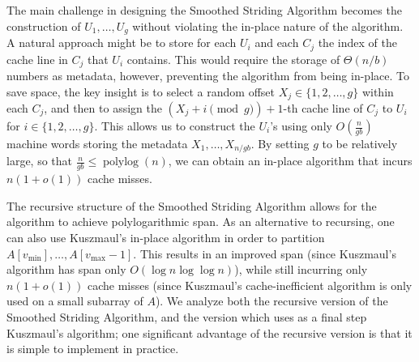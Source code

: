\documentclass[11pt]{article}
\newcommand{\defn}[1]{{\textit{\textbf{\boldmath #1}}} }
\theoremstyle{remark}
\theoremstyle{remark}
\begin{document}
The main challenge in designing the Smoothed Striding Algorithm
becomes the construction of $U_1, \ldots, U_{g}$ without
violating the in-place nature of the algorithm. A natural approach
might be to store for each $U_i$ and each $C_j$ the index of the cache
line in $C_j$ that $U_i$ contains. This would require the storage of
$\Theta(n / b)$ numbers as metadata, however, preventing the algorithm
from being in-place. To save space, the key insight is to select a
random offset $X_j \in \{1, 2, \ldots, g\}$ within each $C_j$, and
then to assign the $(X_j + i \pmod g) + 1$-th cache line of $C_j$ to
$U_i$ for $i \in \{1, 2, \ldots, g\}$. This allows us to construct
the $U_i$'s using only $O\left(\frac{n}{gb}\right)$ machine words
storing the metadata $X_1, \ldots, X_{n / gb}$. By setting $g$ to
be relatively large, so that $\frac{n}{gb} \le
\operatorname{polylog}(n)$, we can obtain an in-place algorithm that
incurs $n (1 + o(1))$ cache misses.

The recursive structure of the Smoothed Striding Algorithm allows for the
algorithm to achieve polylogarithmic span. As an alternative to recursing, one
can also use Kuszmaul's in-place algorithm \cite{Kuszmaul19} in order to
partition $A[v_{\text{min}}], \ldots, A[v_{\text{max}} - 1]$. This results
in an improved span (since Kuszmaul's algorithm has span
only $O(\log n \log \log n)$), while still incurring only $n (1 + o(1))$ cache
misses (since Kuszmaul's cache-inefficient algorithm is only
used on a small subarray of $A$). We analyze both the recursive version of the
Smoothed Striding Algorithm, and the version which uses as a final step
Kuszmaul's algorithm; one significant advantage of the recursive
version is that it is simple to implement in practice.






\end{document}
